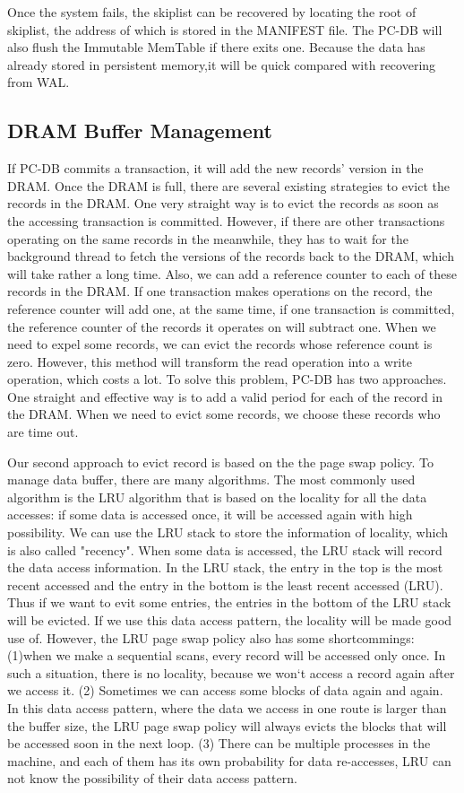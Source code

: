 Once the system fails, 
the skiplist can be recovered  by locating the root of skiplist, 
the address of which is stored in the MANIFEST file. 
The PC-DB will also flush the Immutable MemTable if there exits one.
Because the data has already stored in persistent memory,it will be quick compared with recovering from WAL.



    
\subsection{DRAM Buffer Management}
If PC-DB commits a transaction, it will add the new records' version in the DRAM. Once the DRAM is full, there are several existing strategies to evict the records in the DRAM. One very straight way is to evict the records as soon as the accessing transaction is committed. 
However, if there are other transactions operating on the same records in the meanwhile, they has to wait for the background thread to fetch the versions of the records back to the DRAM, which will take rather a long time. Also, we can  add a reference counter to each of these records in the DRAM. If one transaction makes operations on the record, the reference counter will add one, at the same time, if one transaction is committed, the reference counter of the records it operates on will subtract one. When we need to expel some records, we can evict the records whose reference count is zero. However, this method will transform the read operation into a write operation, which costs a lot. To solve this problem, PC-DB has two approaches. One straight and effective way is to add a valid period for each of the record in the DRAM. When we need to evict some records, we choose these records who are time out. 

Our second approach to evict record is based on the the page swap policy. To manage data buffer, there are many algorithms. The most commonly used algorithm is the LRU algorithm that is based on the locality for all the data accesses: if some data is accessed once, it will be accessed again with high possibility. We can use the LRU stack to store the information of locality, which is also called "recency". When some data is accessed, the LRU stack will record the data access information. In the LRU stack, the entry in the top is the most recent accessed and the entry in the bottom is the least recent accessed (LRU). Thus if we want to evit some entries, the entries in the bottom of the LRU stack will be evicted. If we use this data access pattern, the locality will be made good use of. However, the LRU page swap policy also has some shortcommings: (1)when we make a sequential scans, every record will be accessed only once. In such a situation, there is no locality, because we won`t access a record again after we access it. (2) Sometimes we can access some blocks of data again and again. In this data access pattern, where the data we access in one route is larger than the buffer size, the LRU page swap policy will always evicts the blocks that will be accessed soon in the next loop. (3) There can be multiple processes in the machine, and each of them has its own probability for data re-accesses, LRU can not know the possibility of their data access pattern. 

